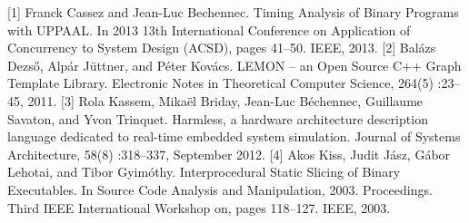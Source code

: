 \documentclass[final]{beamer}
\begin{document}
\begin{frame}
      \small
      
      {\color{jdocgreen1} [1]} Franck Cassez and Jean-Luc Bechennec. Timing Analysis of
      Binary Programs with UPPAAL. In 2013 13th International Conference on Application of
      Concurrency to System Design (ACSD), pages 41–50. IEEE, 2013. {\color{jdocgreen1}
        [2]} Balázs Dezső, Alpár Jüttner, and Péter Kovács. LEMON – an Open Source C++
      Graph Template Library. Electronic Notes in Theoretical Computer Science, 264(5)
      :23–45, 2011. {\color{jdocgreen1} [3]} Rola Kassem, Mikaël Briday, Jean-Luc
      Béchennec, Guillaume Savaton, and Yvon Trinquet. Harmless, a hardware architecture
      description language dedicated to real-time embedded system simulation. Journal of
      Systems Architecture, 58(8) :318–337, September 2012. {\color{jdocgreen1} [4]} Akos
      Kiss, Judit Jász, Gábor Lehotai, and Tibor Gyimóthy.  Interprocedural Static Slicing
      of Binary Executables. In Source Code Analysis and Manipulation,
      2003. Proceedings. Third IEEE International Workshop on, pages 118–127. IEEE, 2003.
      
  \end{frame}
\end{document}
